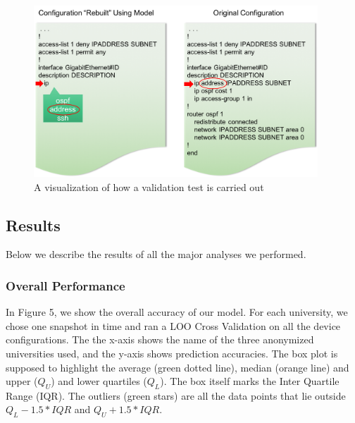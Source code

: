 \begin{figure}[H]
	\centering
	\includegraphics[width=4.2in]{validation_example.png}
	\caption{A visualization of how a validation test is carried out}
\end{figure}

\subsection{Results}

Below we describe the results of all the major analyses we performed.

\subsubsection{Overall Performance}

In Figure 5, we show the overall accuracy of our model. For each university, we chose one snapshot in time and ran a LOO Cross Validation on all the device configurations. The the x-axis shows the name of the three anonymized universities used, and the y-axis shows prediction accuracies. The box plot is supposed to highlight the average (green dotted line), median (orange line) and upper ($Q_U$) and lower quartiles ($Q_L$). The box itself marks the Inter Quartile Range (IQR). The outliers (green stars) are all the data points that lie outside $Q_L - 1.5*IQR$ and $Q_U+1.5*IQR$.\\

